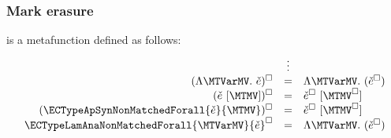 \subsubsection{Mark erasure}
\judgbox{\ensuremath{\erase{\ECMV}}} is a metafunction defined as follows:
%
\[\begin{array}{rcl}
  & \vdots & \\
  \erasesToRow{(\ECTypeLam{\MTVarMV}{\ECMV})}{\ETypeLam{\MTVarMV}{(\erase{\ECMV})}} \\
  \erasesToRow{(\ECTypeAp{\ECMV}{\MTMV})}{\ETypeAp{\erase{\ECMV}}{\erase{\MTMV}}} \\
  \erasesToRow{(\ECTypeApSynNonMatchedForall{\ECMV}{\MTMV})}{\ETypeAp{\erase{\ECMV}}{\erase{\MTMV}}} \\
  \erasesToRow{\ECTypeLamAnaNonMatchedForall{\MTVarMV}{\ECMV}}{\ETypeLam{\MTVarMV}{(\erase{\ECMV})}} \\
\end{array}\]
